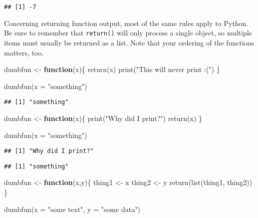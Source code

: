 \documentclass[
]{book}
\newenvironment{Shaded}{\begin{snugshade}}{\end{snugshade}}
\newcommand{\AttributeTok}[1]{\textcolor[rgb]{0.77,0.63,0.00}{#1}}
\newcommand{\ControlFlowTok}[1]{\textcolor[rgb]{0.13,0.29,0.53}{\textbf{#1}}}
\newcommand{\FunctionTok}[1]{\textcolor[rgb]{0.00,0.00,0.00}{#1}}
\newcommand{\NormalTok}[1]{#1}
\newcommand{\OtherTok}[1]{\textcolor[rgb]{0.56,0.35,0.01}{#1}}
\newcommand{\StringTok}[1]{\textcolor[rgb]{0.31,0.60,0.02}{#1}}
\begin{document}
\begin{verbatim}
## [1] -7
\end{verbatim}

Concerning returning function output, most of the same rules apply to Python. Be sure to remember that \texttt{return()} will only process a single object, so multiple items must usually be returned as a list. Note that your ordering of the functions matters, too.

\begin{Shaded}
\begin{Highlighting}[]
\NormalTok{dumbfun }\OtherTok{\textless{}{-}} \ControlFlowTok{function}\NormalTok{(x)\{}
  \FunctionTok{return}\NormalTok{(x)}
  \FunctionTok{print}\NormalTok{(}\StringTok{"This will never print :("}\NormalTok{)}
\NormalTok{\}}

\FunctionTok{dumbfun}\NormalTok{(}\AttributeTok{x =} \StringTok{"something"}\NormalTok{)}
\end{Highlighting}
\end{Shaded}

\begin{verbatim}
## [1] "something"
\end{verbatim}

\begin{Shaded}
\begin{Highlighting}[]
\NormalTok{dumbfun }\OtherTok{\textless{}{-}} \ControlFlowTok{function}\NormalTok{(x)\{}
  \FunctionTok{print}\NormalTok{(}\StringTok{"Why did I print?"}\NormalTok{)}
  \FunctionTok{return}\NormalTok{(x)}
\NormalTok{\}}

\FunctionTok{dumbfun}\NormalTok{(}\AttributeTok{x =} \StringTok{"something"}\NormalTok{)}
\end{Highlighting}
\end{Shaded}

\begin{verbatim}
## [1] "Why did I print?"
\end{verbatim}

\begin{verbatim}
## [1] "something"
\end{verbatim}

\begin{Shaded}
\begin{Highlighting}[]
\NormalTok{dumbfun }\OtherTok{\textless{}{-}} \ControlFlowTok{function}\NormalTok{(x,y)\{}
\NormalTok{  thing1 }\OtherTok{\textless{}{-}}\NormalTok{ x}
\NormalTok{  thing2 }\OtherTok{\textless{}{-}}\NormalTok{ y}
  \FunctionTok{return}\NormalTok{(}\FunctionTok{list}\NormalTok{(thing1, thing2))}
\NormalTok{\}}

\FunctionTok{dumbfun}\NormalTok{(}\AttributeTok{x =} \StringTok{"some text"}\NormalTok{, }\AttributeTok{y =} \StringTok{"some data"}\NormalTok{)}
\end{Highlighting}
\end{Shaded}
\end{document}
